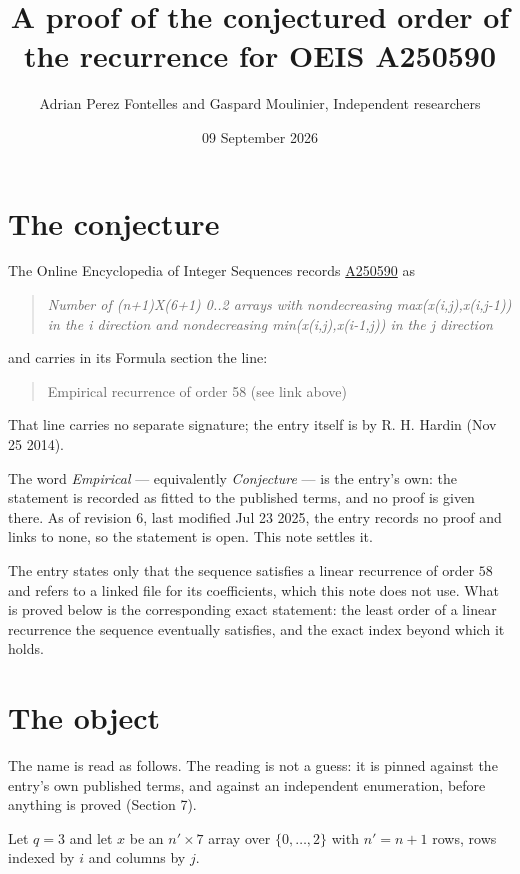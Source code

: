 \documentclass[11pt]{article}
\title{A proof of the conjectured order of the recurrence for OEIS A250590}
\author{Adrian Perez Fontelles and Gaspard Moulinier, Independent researchers}
\date{09 September 2026}
\theoremstyle{definition}
\begin{document}
\maketitle
\section{The conjecture}

The Online Encyclopedia of Integer Sequences records \href{https://oeis.org/A250590}{A250590} as

\begin{quote}\itshape Number of (n+1)X(6+1) 0..2 arrays with nondecreasing max(x(i,j),x(i,j-1)) in the i direction and nondecreasing min(x(i,j),x(i-1,j)) in the j direction\end{quote}

and carries in its Formula section the line:

\begin{quote}\ttfamily Empirical recurrence of order 58 (see link above)\end{quote}

That line carries no separate signature; the entry itself is by R. H. Hardin (Nov 25 2014).

The word {\itshape Empirical} --- equivalently {\itshape Conjecture} --- is the entry's own: the statement is recorded as fitted to the published terms, and no proof is given there. As of revision 6, last modified Jul 23 2025, the entry records no proof and links to none, so the statement is open. This note settles it.

The entry states only that the sequence satisfies a linear recurrence of order $58$ and refers to a linked file for its coefficients, which this note does not use. What is proved below is the corresponding exact statement: the least order of a linear recurrence the sequence eventually satisfies, and the exact index beyond which it holds.

\section{The object}

The name is read as follows. The reading is not a guess: it is pinned against the entry's own published terms, and against an independent enumeration, before anything is proved (Section 7).

Let $q = 3$ and let $x$ be an $n' \times 7$ array over $\{0,\dots,2\}$ with $n' = n + 1$ rows, rows indexed by $i$ and columns by $j$.
\end{document}
